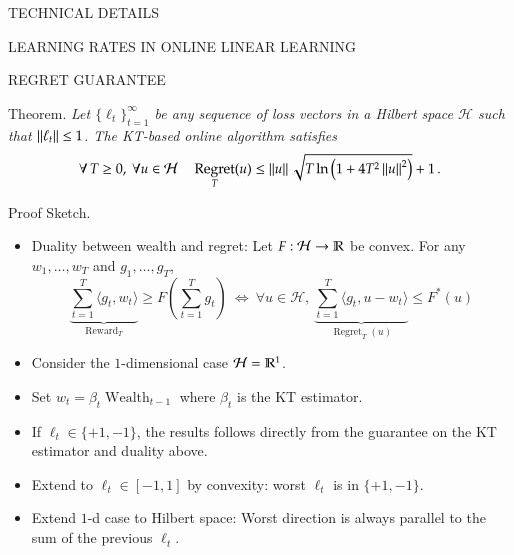 \documentclass[final,t,serif,mathserif]{beamer}
\DeclareMathOperator{\Wealth}{Wealth}
\renewcommand{\H}{\mathcal{H}}  %
\DeclareMathOperator{\Regret}{Regret}
\DeclareMathOperator{\Reward}{Reward}
\def\blockspacec{\vspace{-0.08cm}}
\begin{document}
\begin{frame}{}
\begin{columns}[t]
\begin{column}{.33\linewidth}
\begin{block}{TECHNICAL DETAILS}
\begin{minipage}{.98\linewidth}
\begin{block}{LEARNING RATES IN ONLINE LINEAR LEARNING}
    \blockspacec
    \end{block}

    \begin{block}{REGRET GUARANTEE}
    \blockspacec
    
    \alert{Theorem.} \emph{
	Let $\{\ell_t\}_{t=1}^\infty$ be any sequence of loss vectors
	in a Hilbert space $\H$ such that $\left\|{\ell_t}\right\| \le 1$.
	The KT-based online algorithm satisfies
	$$
	\forall \, T \ge 0, \
	\forall u \in \H \quad
	\Regret_T(u) \le \norm{u} \sqrt{T \ln\left(1 + 4T^2 \norm{u}^2 \right)} + 1 \, .
	$$
    }

    \vspace{.5cm}

    \alert{Proof Sketch.}
    \begin{itemize}
    \item Duality between wealth and regret: Let $F:\H \to \R$ be convex. For any $w_1, \dots, w_T$ and $g_1, \dots, g_T$,
    \[
      \underbrace{\sum_{t=1}^T \langle g_t, w_t \rangle}_{\Reward_T} \ge F\left( \sum_{t=1}^T g_t \right)
      \ \Leftrightarrow \
      \forall u \in \H, \
      \underbrace{\sum_{t=1}^T \langle g_t, u - w_t\rangle}_{\Regret_T(u)} \le F^*(u)
    \]
    \item Consider the $1$-dimensional case $\H=\R^1$.
    \item Set $w_t=\beta_t \Wealth_{t-1}$ where $\beta_t$ is the KT estimator.
    \item If $\ell_t \in \{+1, -1\}$, the results follows directly from the guarantee on the KT estimator and duality above.
    \item Extend to $\ell_t \in [-1,1]$ by convexity: worst $\ell_t$ is in $\{+1,-1\}$.
    \item Extend $1$-d case to Hilbert space: Worst direction is always parallel to the sum of the previous $\ell_t$.
    \end{itemize}
    \end{block}
    \end{minipage}
    \blockspacec
    \end{block}
\end{column}


\end{columns}
\end{frame}
\end{document}

